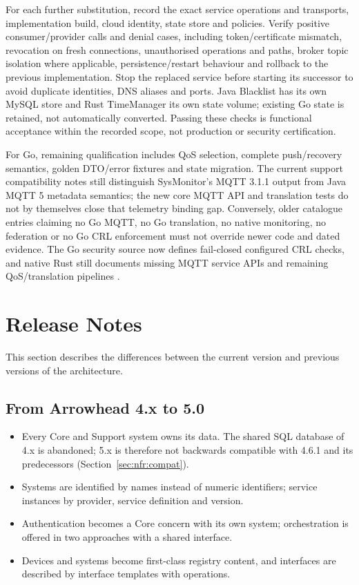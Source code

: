 \documentclass[a4paper]{arrowhead}
\begin{document}
For each further substitution, record the exact service operations and transports,
implementation build, cloud identity, state store and policies. Verify positive
consumer/provider calls and denial cases, including token/certificate mismatch,
revocation on fresh connections, unauthorised operations and paths, broker topic
isolation where applicable, persistence/restart behaviour and rollback to the
previous implementation. Stop the replaced service before starting its successor
to avoid duplicate identities, DNS aliases and ports. Java Blacklist has its own
MySQL store and Rust TimeManager its own state volume; existing Go state is
retained, not automatically converted. Passing these checks is functional
acceptance within the recorded scope, not production or security certification.

For Go, remaining qualification includes QoS selection, complete push/recovery
semantics, golden DTO/error fixtures and state migration. The current support
compatibility notes still distinguish SysMonitor's MQTT 3.1.1 output from Java
MQTT 5 metadata semantics; the new core MQTT API and translation tests do not by
themselves close that telemetry binding gap. Conversely, older catalogue entries
claiming no Go MQTT, no Go translation, no native monitoring, no federation or
no Go CRL enforcement must not override newer code and dated evidence. The Go
security source now defines fail-closed configured CRL checks, and native Rust
still documents missing MQTT service APIs and remaining QoS/translation pipelines
\cite{nativeCompatibility20261024,goMqtt20261024,rustFederation20261019}.

\section{Release Notes}
\label{sec:release}

This section describes the differences between the current version and previous versions of the
architecture.

\subsection{From Arrowhead 4.x to 5.0}
\begin{itemize}
  \item Every Core and Support system owns its data. The shared SQL database of 4.x is
        abandoned; 5.x is therefore not backwards compatible with 4.6.1 and its predecessors
        (Section~\ref{sec:nfr:compat}).
  \item Systems are identified by names instead of numeric identifiers; service instances by
        provider, service definition and version.
  \item Authentication becomes a Core concern with its own system; orchestration is offered in
        two approaches with a shared interface.
  \item Devices and systems become first-class registry content, and interfaces are described by
        interface templates with operations.
\end{itemize}
\end{document}
